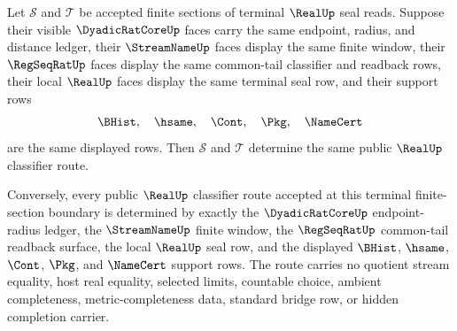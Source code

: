 \begin{theorem}
\label{thm:real-terminal-finite-section-classifier-determinacy}
Let $\mathcal S$ and $\mathcal T$ be accepted finite sections of terminal
$\RealUp$ seal reads. Suppose their visible $\DyadicRatCoreUp$ faces carry the
same endpoint, radius, and distance ledger, their $\StreamNameUp$ faces display
the same finite window, their $\RegSeqRatUp$ faces display the same common-tail
classifier and readback rows, their local $\RealUp$ faces display the same
terminal seal row, and their support rows
$$
\BHist,\quad \hsame,\quad \Cont,\quad \Pkg,\quad \NameCert
$$
are the same displayed rows. Then $\mathcal S$ and $\mathcal T$ determine the
same public $\RealUp$ classifier route.

Conversely, every public $\RealUp$ classifier route accepted at this terminal
finite-section boundary is determined by exactly the $\DyadicRatCoreUp$
endpoint-radius ledger, the $\StreamNameUp$ finite window, the
$\RegSeqRatUp$ common-tail readback surface, the local $\RealUp$ seal row, and
the displayed $\BHist$, $\hsame$, $\Cont$, $\Pkg$, and $\NameCert$ support rows.
The route carries no quotient stream equality, host real equality, selected
limits, countable choice, ambient completeness, metric-completeness data,
standard bridge row, or hidden completion carrier.
\end{theorem}
